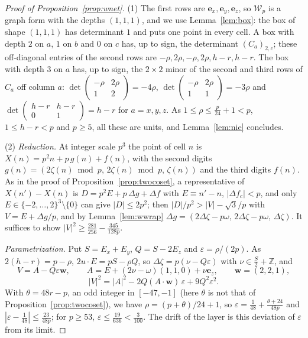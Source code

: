 \documentclass[11pt]{amsart}
\theoremstyle{definition}
\theoremstyle{plain}
\newcommand{\Z}{\mathbb{Z}}
\newcommand{\e}{\mathbf{e}}
\begin{document}
\begin{proof}[Proof of Proposition~\ref{prop:wnet}]
(1) The first rows are $\e_x,\e_y,\e_z$, so $\mathcal W_p$ is a graph form with the depths $(1,1,1)$, and we use Lemma~\ref{lem:box}: the box of shape $(1,1,1)$ has determinant $1$ and puts one point in every cell. A box with depth $2$ on $a$, $1$ on $b$ and $0$ on $c$ has, up to sign, the determinant $(C_a)_{2,c}$; these off-diagonal entries of the second rows are $-\rho,2\rho,-\rho,2\rho,h-r,h-r$. The box with depth $3$ on $a$ has, up to sign, the $2\times2$ minor of the second and third rows of $C_a$ off column $a$: $\det\left(\begin{smallmatrix}-\rho&2\rho\\1&2\end{smallmatrix}\right)=-4\rho$, $\det\left(\begin{smallmatrix}-\rho&2\rho\\1&1\end{smallmatrix}\right)=-3\rho$ and $\det\left(\begin{smallmatrix}h-r&h-r\\0&1\end{smallmatrix}\right)=h-r$ for $a=x,y,z$. As $1\le\rho\le\frac p{24}+1<p$, $1\le h-r<p$ and $p\ge5$, all these are units, and Lemma~\ref{lem:nie} concludes.

(2) \emph{Reduction.} At integer scale $p^3$ the point of cell $n$ is $X(n)=p^2n+p\,g(n)+f(n)$, with the second digits $g(n)=(2\zeta(n)\bmod p,\,2\zeta(n)\bmod p,\,\zeta(n))$ and the third digits $f(n)$. As in the proof of Proposition~\ref{prop:twocoset}, a representative of $X(n')-X(n)$ is $D=p^2E+p\,\Delta g+\Delta f$ with $E\equiv n'-n$, $|\Delta f_c|<p$, and only $E\in\{-2,\dots,2\}^3\setminus\{0\}$ can give $|D|\le2p^2$; then $|D|/p^2>|V|-\sqrt3/p$ with $V=E+\Delta g/p$, and by Lemma~\ref{lem:wwrap} $\Delta g=(2\Delta\zeta-p\omega,\,2\Delta\zeta-p\omega,\,\Delta\zeta)$. It suffices to show $|V|^2\ge\frac{281}{256}-\frac{345}{128p}$.

\emph{Parametrization.} Put $S=E_x+E_y$, $Q=S-2E_z$ and $\varepsilon=\rho/(2p)$. As $2(h-r)=p-\rho$, $2u\cdot E=pS-\rho Q$, so $\Delta\zeta=p(\nu-Q\varepsilon)$ with $\nu\in\frac S2+\Z$, and
\[
V=A-Q\varepsilon\mathbf w,\qquad A=E+(2\nu-\omega)(1,1,0)+\nu\e_z,\qquad \mathbf w=(2,2,1),
\]
\[
|V|^2=|A|^2-2Q(A\cdot\mathbf w)\,\varepsilon+9Q^2\varepsilon^2 .
\]
With $\theta=48r-p$, an odd integer in $[-47,-1]$ (here $\theta$ is not that of Proposition~\ref{prop:twocoset}), we have $\rho=(p+\theta)/24+1$, so $\varepsilon=\frac1{48}+\frac{\theta+24}{48p}$ and $|\varepsilon-\frac1{48}|\le\frac{23}{48p}$; for $p\ge53$, $\varepsilon\le\frac{19}{636}<\frac3{100}$. The drift of the layer is this deviation of $\varepsilon$ from its limit.


\end{proof}
\end{document}
